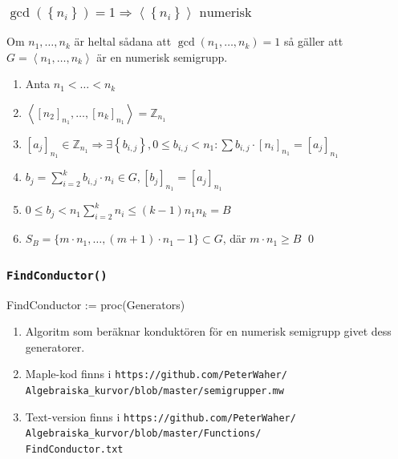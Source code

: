\documentclass{beamer}
\begin{document}
\begin{frame}
	\frametitle{$\gcd(\left\{n_i\right\})=1 \Longrightarrow \left<\left\{n_i\right\}\right> \text{ numerisk}$}
\begin{Theorem}
	Om $n_1, \ldots, n_k$ är heltal sådana att $\gcd(n_1, \ldots, n_k) = 1$ så gäller att $G = \left<n_1, \ldots, n_k\right>$ är en numerisk semigrupp.
\end{Theorem}

\begin{enumerate}
	\item<2->Anta $n_1 < \ldots < n_k$
	\item<3->$\left< \left[n_2\right]_{n_1}, \ldots, \left[n_k\right]_{n_1} \right> = \mathbb{Z}_{n_1}$
	\item<4->$[a_j]_{n_1} \in \mathbb{Z}_{n_1} \Longrightarrow \exists \left\{b_{i,j}\right\}, 0 \leq b_{i,j} < n_1 : \sum b_{i,j} \cdot [n_i]_{n_1} = [a_j]_{n_1}$
	\item<5->$b_j = \sum_{i=2}^{k} b_{i,j} \cdot n_i \in G, [b_j]_{n_1} = [a_j]_{n_1}$
	\item<6->$0 \leq b_j < n_1 \sum_{i=2}^{k} n_i \leq (k-1) n_1 n_k = B$
	\item<7->$S_B = \{m\cdot n_1, \ldots, (m+1)\cdot n_1 - 1\} \subset G$, där $m\cdot n_1 \geq B$
	\qed
\end{enumerate}
\end{frame}




\begin{frame}
	\frametitle{\texttt{FindConductor()}}
	
	\begin{semiverbatim}
		FindConductor := proc(Generators)
	\end{semiverbatim}
	
	\begin{enumerate}
		\item<1-> Algoritm som beräknar konduktören för en numerisk semigrupp givet dess generatorer.
		
		\item<2-> Maple-kod finns i \texttt{https://github.com/PeterWaher/\\
			\qquad Algebraiska\_kurvor/blob/master/semigrupper.mw}
		
		\item<3-> Text-version finns i
		\texttt{https://github.com/PeterWaher/\\
			\qquad Algebraiska\_kurvor/blob/master/Functions/\\
			\qquad FindConductor.txt} 
	\end{enumerate}
\end{frame}
\end{document}
